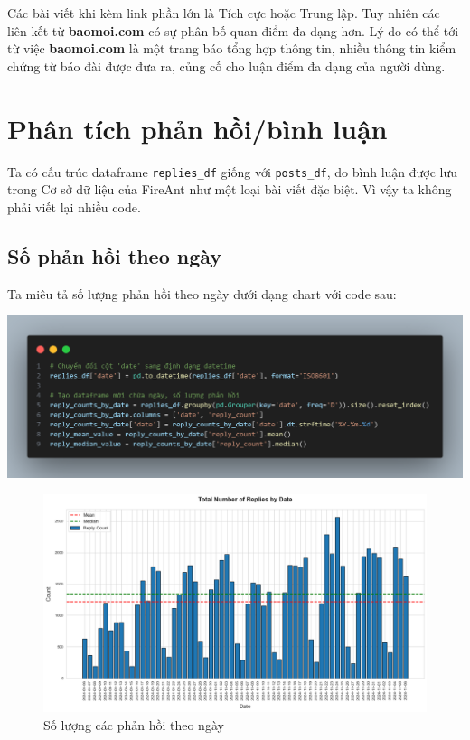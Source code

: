 Các bài viết khi kèm link phần lớn là Tích cực hoặc Trung lập. Tuy nhiên các liên kết từ \textbf{baomoi.com} có sự phân bố quan điểm đa dạng hơn. Lý do có thể tới từ việc \textbf{baomoi.com} là một trang báo tổng hợp thông tin, nhiều thông tin kiểm chứng từ báo đài được đưa ra, củng cố cho luận điểm đa dạng của người dùng.

\section{Phân tích phản hồi/bình luận}
Ta có cấu trúc dataframe \texttt{replies\_df} giống với \texttt{posts\_df}, do bình luận được lưu trong Cơ sở dữ liệu của FireAnt như một loại bài viết đặc biệt. Vì vậy ta không phải viết lại nhiều code.

\subsection{Số phản hồi theo ngày}
Ta miêu tả số lượng phản hồi theo ngày dưới dạng chart với code sau:

\begin{center}
\includegraphics[width=0.8\linewidth]{images/code-2.18.png}
\end{center}

\begin{figure}[H]
    \centering
    \includegraphics[width=1\linewidth]{images/plot-2.22-column_chart.png}
    \caption{Số lượng các phản hồi theo ngày}
    \label{fig:2.8}
\end{figure}

